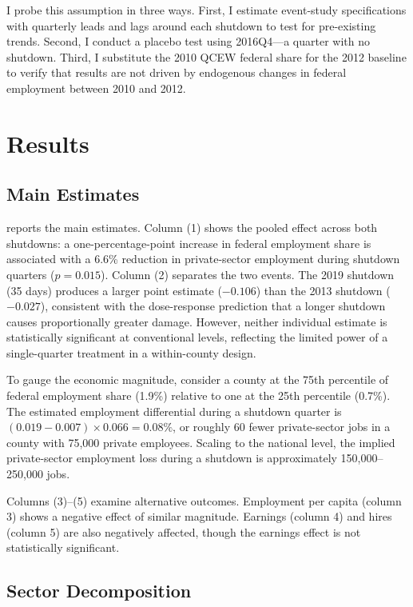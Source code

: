 \documentclass[12pt]{article}
\begin{document}
I probe this assumption in three ways. First, I estimate event-study specifications with quarterly leads and lags around each shutdown to test for pre-existing trends. Second, I conduct a placebo test using 2016Q4---a quarter with no shutdown. Third, I substitute the 2010 QCEW federal share for the 2012 baseline to verify that results are not driven by endogenous changes in federal employment between 2010 and 2012.

\section{Results}

\subsection{Main Estimates}

 reports the main estimates. Column (1) shows the pooled effect across both shutdowns: a one-percentage-point increase in federal employment share is associated with a 6.6\% reduction in private-sector employment during shutdown quarters ($p = 0.015$). Column (2) separates the two events. The 2019 shutdown (35 days) produces a larger point estimate ($-0.106$) than the 2013 shutdown ($-0.027$), consistent with the dose-response prediction that a longer shutdown causes proportionally greater damage. However, neither individual estimate is statistically significant at conventional levels, reflecting the limited power of a single-quarter treatment in a within-county design.

To gauge the economic magnitude, consider a county at the 75th percentile of federal employment share (1.9\%) relative to one at the 25th percentile (0.7\%). The estimated employment differential during a shutdown quarter is $(0.019 - 0.007) \times 0.066 = 0.08\%$, or roughly 60 fewer private-sector jobs in a county with 75,000 private employees. Scaling to the national level, the implied private-sector employment loss during a shutdown is approximately 150,000--250,000 jobs.

{\footnotesize}

Columns (3)--(5) examine alternative outcomes. Employment per capita (column 3) shows a negative effect of similar magnitude. Earnings (column 4) and hires (column 5) are also negatively affected, though the earnings effect is not statistically significant.

\subsection{Sector Decomposition}
\end{document}
